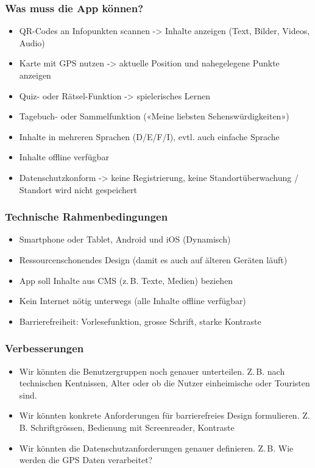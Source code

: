 \documentclass[10pt]{article}
\begin{document}
	\subsubsection[Was]{Was muss die App können?}
	\begin{itemize}
		\item QR-Codes an Infopunkten scannen -> Inhalte anzeigen (Text, Bilder, Videos, Audio)
		\item Karte mit GPS nutzen -> aktuelle Position und nahegelegene Punkte anzeigen
		\item Quiz- oder Rätsel-Funktion -> spielerisches Lernen
		\item Tagebuch- oder Sammelfunktion («Meine liebsten Sehenswürdigkeiten»)
		\item Inhalte in mehreren Sprachen (D/E/F/I), evtl. auch einfache Sprache
		\item Inhalte offline verfügbar
		\item Datenschutzkonform -> keine Registrierung, keine Standortüberwachung / Standort wird nicht gespeichert
	\end{itemize}
	\subsubsection[Womit]{Technische Rahmenbedingungen}
	\begin{itemize}
		\item Smartphone oder Tablet, Android und iOS (Dynamisch)
		\item Ressourcenschonendes Design (damit es auch auf älteren Geräten läuft)
		\item App soll Inhalte aus CMS (z.\,B. Texte, Medien) beziehen
		\item Kein Internet nötig unterwegs (alle Inhalte offline verfügbar)
		\item Barrierefreiheit: Vorlesefunktion, grosse Schrift, starke Kontraste
	\end{itemize}
	\subsubsection[Verbesserungen]{Verbesserungen}
		\begin{itemize}
			\item Wir könnten die Benutzergruppen noch genauer unterteilen. Z.\,B. nach technischen Kentnissen, Alter oder ob die Nutzer einheimische oder Touristen sind.
			\item Wir könnten konkrete Anforderungen für barrierefreies Design formulieren. Z.\,B. Schriftgrössen, Bedienung mit Screenreader, Kontraste
			\item Wir könnten die Datenschutzanforderungen genauer definieren. Z.\,B. Wie werden die GPS Daten verarbeitet?
		\end{itemize}
		\pagebreak
\end{document}
